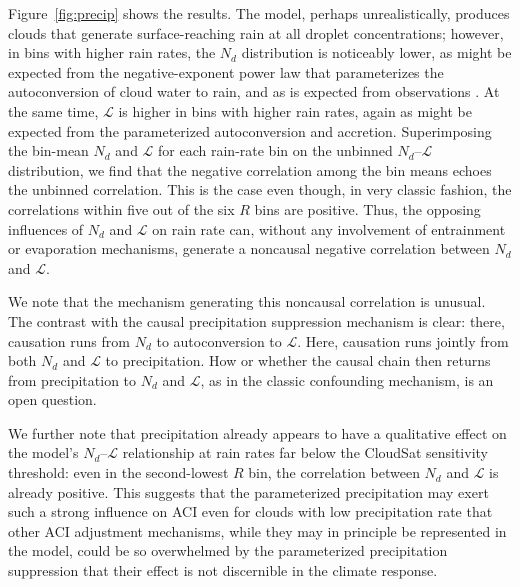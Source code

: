 \documentclass[acp, manuscript]{copernicus}\usepackage[]{graphicx}\usepackage[]{xcolor}
\newcommand{\jmu}{\ensuremath{j_\mu}}
\newcommand{\jmcomment}[1]{\todo[inline, color=red!50]{\jmu: #1}}
\newcommand\nd{\ensuremath{N_d}}
\newcommand\lwp{\ensuremath{\mathcal L}}
\begin{document}
Figure~\ref{fig:precip} shows the results.   The model, perhaps unrealistically, produces clouds that generate surface-reaching rain at all
droplet concentrations; however, in bins with higher rain rates, the \nd{} distribution
is noticeably lower, as might be expected from the negative-exponent power law
that parameterizes the autoconversion of cloud water to rain, and as is expected from
observations \citep{Pawlowska2003,Comstock2004}.  At the same
time, \lwp{} is higher in bins with higher rain rates, again as might be expected
from the parameterized autoconversion and accretion.  Superimposing the bin-mean \nd{} and
\lwp{} for each rain-rate bin on the unbinned \nd--\lwp{} distribution, we find
that the negative correlation among the bin means echoes the unbinned
correlation.  This is the case even though, in very classic
\citet{Simpson1951} fashion, the correlations within five out of the six $R$
bins are positive.
Thus, the opposing influences of \nd{} and \lwp{} on rain
rate can, without any involvement of entrainment or evaporation mechanisms,
generate a noncausal negative correlation between \nd{} and \lwp{}.  

We note that the mechanism generating this noncausal correlation
is unusual.  The contrast with the causal precipitation suppression mechanism is
clear: there, causation runs from \nd{} to autoconversion to \lwp{}.  Here,
causation runs jointly from both \nd{} and \lwp{} to
precipitation.  How or whether the causal chain then returns from precipitation to
\nd{} and \lwp{}, as in the classic confounding mechanism, is an open question.

We further note that precipitation already appears to have a qualitative effect
on the model's \nd--\lwp{} relationship at rain rates far below the CloudSat
sensitivity threshold: even in the second-lowest $R$ bin, the correlation
between \nd{} and \lwp{} is already positive.  This suggests that the
parameterized precipitation may exert such a strong influence on ACI even
for clouds with low precipitation rate that other ACI adjustment mechanisms, while they may in principle
be represented in the model, could be so overwhelmed by the parameterized
precipitation suppression that their effect is not discernible in the climate
response.  %
\end{document}
